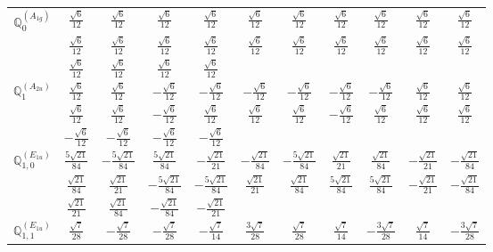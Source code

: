 \documentclass[fleqn,10pt,landscape]{article}
\begin{document}
\begin{itemize}
{\begin{center}
\begin{longtable}{ccccccccccc}
$\mathbb{Q}_{0}^{(A_{1g})}$ & $ \frac{\sqrt{6}}{12} $ & $ \frac{\sqrt{6}}{12} $ & $ \frac{\sqrt{6}}{12} $ & $ \frac{\sqrt{6}}{12} $ & $ \frac{\sqrt{6}}{12} $ & $ \frac{\sqrt{6}}{12} $ & $ \frac{\sqrt{6}}{12} $ & $ \frac{\sqrt{6}}{12} $ & $ \frac{\sqrt{6}}{12} $ & $ \frac{\sqrt{6}}{12} $ \\
& $ \frac{\sqrt{6}}{12} $ & $ \frac{\sqrt{6}}{12} $ & $ \frac{\sqrt{6}}{12} $ & $ \frac{\sqrt{6}}{12} $ & $ \frac{\sqrt{6}}{12} $ & $ \frac{\sqrt{6}}{12} $ & $ \frac{\sqrt{6}}{12} $ & $ \frac{\sqrt{6}}{12} $ & $ \frac{\sqrt{6}}{12} $ & $ \frac{\sqrt{6}}{12} $ \\
& $ \frac{\sqrt{6}}{12} $ & $ \frac{\sqrt{6}}{12} $ & $ \frac{\sqrt{6}}{12} $ & $ \frac{\sqrt{6}}{12} $ & $  $ & $  $ & $  $ & $  $ & $  $ & $  $ \\ \hline
$\mathbb{Q}_{1}^{(A_{2u})}$ & $ \frac{\sqrt{6}}{12} $ & $ \frac{\sqrt{6}}{12} $ & $ - \frac{\sqrt{6}}{12} $ & $ - \frac{\sqrt{6}}{12} $ & $ - \frac{\sqrt{6}}{12} $ & $ - \frac{\sqrt{6}}{12} $ & $ - \frac{\sqrt{6}}{12} $ & $ - \frac{\sqrt{6}}{12} $ & $ \frac{\sqrt{6}}{12} $ & $ \frac{\sqrt{6}}{12} $ \\
& $ \frac{\sqrt{6}}{12} $ & $ \frac{\sqrt{6}}{12} $ & $ - \frac{\sqrt{6}}{12} $ & $ \frac{\sqrt{6}}{12} $ & $ \frac{\sqrt{6}}{12} $ & $ \frac{\sqrt{6}}{12} $ & $ - \frac{\sqrt{6}}{12} $ & $ \frac{\sqrt{6}}{12} $ & $ \frac{\sqrt{6}}{12} $ & $ \frac{\sqrt{6}}{12} $ \\
& $ - \frac{\sqrt{6}}{12} $ & $ - \frac{\sqrt{6}}{12} $ & $ - \frac{\sqrt{6}}{12} $ & $ - \frac{\sqrt{6}}{12} $ & $  $ & $  $ & $  $ & $  $ & $  $ & $  $ \\ \hline
$\mathbb{Q}_{1,0}^{(E_{1u})}$ & $ \frac{5 \sqrt{21}}{84} $ & $ - \frac{5 \sqrt{21}}{84} $ & $ \frac{5 \sqrt{21}}{84} $ & $ - \frac{\sqrt{21}}{21} $ & $ - \frac{\sqrt{21}}{84} $ & $ - \frac{5 \sqrt{21}}{84} $ & $ \frac{\sqrt{21}}{21} $ & $ \frac{\sqrt{21}}{84} $ & $ - \frac{\sqrt{21}}{21} $ & $ - \frac{\sqrt{21}}{84} $ \\
& $ \frac{\sqrt{21}}{84} $ & $ \frac{\sqrt{21}}{21} $ & $ - \frac{5 \sqrt{21}}{84} $ & $ - \frac{5 \sqrt{21}}{84} $ & $ \frac{\sqrt{21}}{21} $ & $ \frac{\sqrt{21}}{84} $ & $ \frac{5 \sqrt{21}}{84} $ & $ \frac{5 \sqrt{21}}{84} $ & $ - \frac{\sqrt{21}}{21} $ & $ - \frac{\sqrt{21}}{84} $ \\
& $ \frac{\sqrt{21}}{21} $ & $ \frac{\sqrt{21}}{84} $ & $ - \frac{\sqrt{21}}{84} $ & $ - \frac{\sqrt{21}}{21} $ & $  $ & $  $ & $  $ & $  $ & $  $ & $  $ \\ \hline
$\mathbb{Q}_{1,1}^{(E_{1u})}$ & $ \frac{\sqrt{7}}{28} $ & $ - \frac{\sqrt{7}}{28} $ & $ - \frac{\sqrt{7}}{28} $ & $ - \frac{\sqrt{7}}{14} $ & $ \frac{3 \sqrt{7}}{28} $ & $ \frac{\sqrt{7}}{28} $ & $ \frac{\sqrt{7}}{14} $ & $ - \frac{3 \sqrt{7}}{28} $ & $ \frac{\sqrt{7}}{14} $ & $ - \frac{3 \sqrt{7}}{28} $ \\

\end{longtable}
\end{center}}
\end{itemize}
\end{document}

